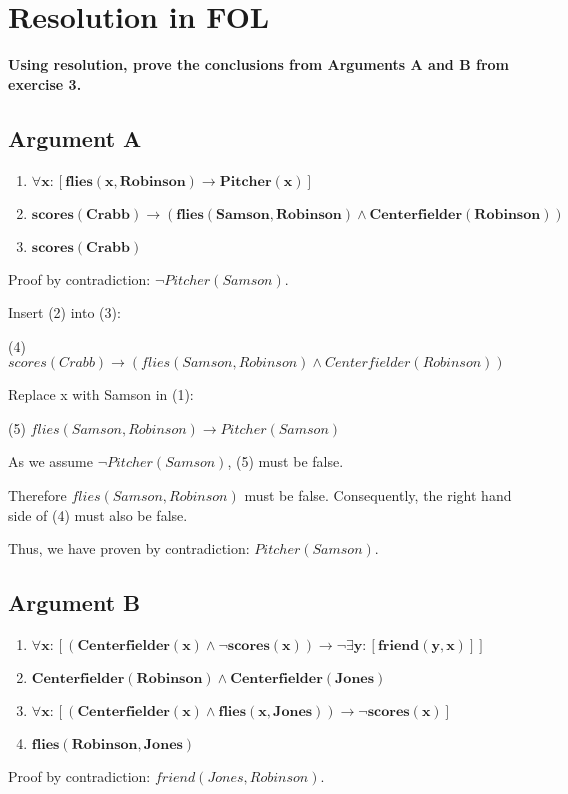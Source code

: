 \section{Resolution in FOL}
\begin{large}
    \textbf{Using resolution, prove the conclusions from Arguments A and B from exercise 3.}
    \subsection{Argument A}
    \begin{enumerate}
        \item $\mathbf{\forall x : [flies(x, Robinson) \rightarrow Pitcher(x)]}$
        \item $\mathbf{scores(Crabb) \rightarrow (flies(Samson, Robinson) \land Centerfielder(Robinson))}$
        \item $\mathbf{scores(Crabb)}$
    \end{enumerate}
    Proof by contradiction\@: $\neg Pitcher(Samson)$.

    Insert (2) into (3):

    (4) $ scores(Crabb) \rightarrow (flies(Samson, Robinson) \land Centerfielder(Robinson)) $

    Replace x with Samson in (1):

    (5) $flies(Samson, Robinson) \rightarrow Pitcher(Samson)$

    As we assume $\neg Pitcher(Samson)$, (5) must be false.

    Therefore $flies(Samson, Robinson)$ must be false.
    Consequently, the right hand side of (4) must also be false.

    Thus, we have proven by contradiction\@: $ Pitcher(Samson)$.

    \subsection{Argument B}

    \begin{enumerate}
        \item $\mathbf{\forall x : [(Centerfielder(x) \land \neg scores(x)) \rightarrow \neg \exists y : [friend(y, x)]]}$
        \item $\mathbf{Centerfielder(Robinson) \land Centerfielder(Jones)}$
        \item $\mathbf{\forall x : [(Centerfielder(x) \land flies(x, Jones)) \rightarrow \neg scores(x)]}$
        \item $\mathbf{flies(Robinson, Jones)}$
    \end{enumerate}
    Proof by contradiction\@: $friend(Jones, Robinson)$.


\end{large}
